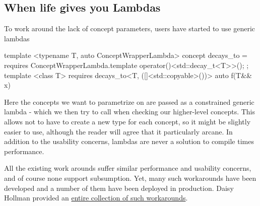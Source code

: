 \documentclass{wg21}
\begin{document}

\subsection{When life gives you Lambdas}

To work around the lack of concept parameters, users have started to use generic lambdas

\begin{colorblock}
template <typename T, auto ConceptWrapperLambda>
concept decays_to = requires {
    ConceptWrapperLambda.template operator()<std::decay_t<T>>();
};
template <class T>
requires decays_to<T, ([]<std::copyable>(){})>
auto f(T&& x) {}
\end{colorblock}

Here the concepts we want to parametrize on are passed as a constrained generic lambda - which we then try to call when checking our higher-level concepts.
This allows not to have to create a new type for each concept, so it might be slightly easier to use, although the reader will agree that it particularly arcane.
In addition to the usability concerns, lambdas are never a solution to compile times performance.

All the existing work arounds suffer similar performance and usability concerns, and of course none support subsumption.
Yet, many such workarounds have been developed and a number of them have been deployed in production.
Daisy Hollman provided an \href{https://p2841.godbolt.org/z/efYK1crb3}{entire collection of such workarounds}.

\pagebreak
\end{document}
